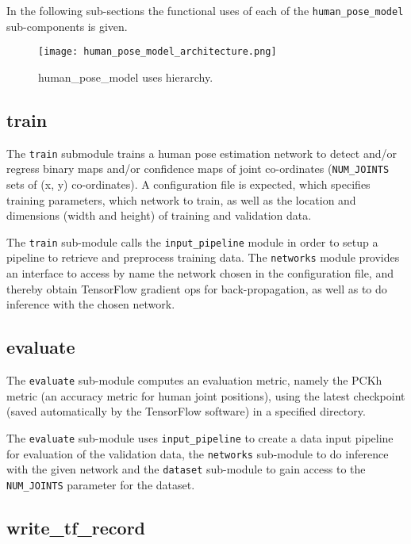 \documentclass{scrreprt}
\begin{document}
In the following sub-sections the functional uses of each of the
\verb|human_pose_model| sub-components is given.

\begin{figure}[!ht]
        \centering
        \caption{human\_pose\_model uses hierarchy.}
        \texttt{[image: human\_pose\_model\_architecture.png]}
        \label{human_pose_model_arch}
\end{figure}

\subsection{train}

The \verb|train| submodule trains a human pose estimation network to detect
and/or regress binary maps and/or confidence maps of joint co-ordinates
(\verb|NUM_JOINTS| sets of (x, y) co-ordinates). A configuration file is
expected, which specifies training parameters, which network to train, as well
as the location and dimensions (width and height) of training and validation
data.

The \verb|train| sub-module calls the \verb|input_pipeline| module in order to
setup a pipeline to retrieve and preprocess training data. The \verb|networks|
module provides an interface to access by name the network chosen in the
configuration file, and thereby obtain TensorFlow gradient ops for
back-propagation, as well as to do inference with the chosen network.

\subsection{evaluate}

The \verb|evaluate| sub-module computes an evaluation metric, namely the PCKh
metric (an accuracy metric for human joint positions), using the latest
checkpoint (saved automatically by the TensorFlow software) in a specified
directory.

The \verb|evaluate| sub-module uses \verb|input_pipeline| to create a data
input pipeline for evaluation of the validation data, the \verb|networks|
sub-module to do inference with the given network and the \verb|dataset|
sub-module to gain access to the \verb|NUM_JOINTS| parameter for the dataset.

\subsection{write\_tf\_record}
\end{document}
